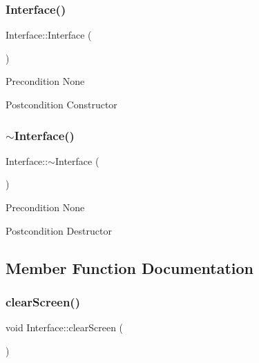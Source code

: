 \subsubsection{\texorpdfstring{Interface()}{Interface()}}
{\footnotesize\ttfamily Interface\+::\+Interface (\begin{DoxyParamCaption}{ }\end{DoxyParamCaption})}

\begin{DoxyPrecond}{Precondition}
None 
\end{DoxyPrecond}
\begin{DoxyPostcond}{Postcondition}
Constructor 
\end{DoxyPostcond}
\mbox{\label{classInterface_a19179888f29f18f1be54a3dfe98f68c0}} 
\subsubsection{\texorpdfstring{$\sim$\+Interface()}{~Interface()}}
{\footnotesize\ttfamily Interface\+::$\sim$\+Interface (\begin{DoxyParamCaption}{ }\end{DoxyParamCaption})}

\begin{DoxyPrecond}{Precondition}
None 
\end{DoxyPrecond}
\begin{DoxyPostcond}{Postcondition}
Destructor 
\end{DoxyPostcond}


\subsection{Member Function Documentation}
\mbox{\label{classInterface_af92bb2aeecc6a19095af23fa78b49451}} 
\subsubsection{\texorpdfstring{clear\+Screen()}{clearScreen()}}
{\footnotesize\ttfamily void Interface\+::clear\+Screen (\begin{DoxyParamCaption}{ }\end{DoxyParamCaption})\hspace{0.3cm}{\ttfamily [static]}}

